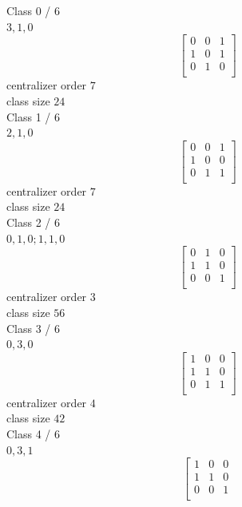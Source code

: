 \begin{mdframed}[style=MyFrame]
$$$$
\bigskip
Class 0 / 6\\
$3,1,0$
$$
\left[
\begin{array}{*{3}{r}}
         0 &          0 &          1\\
         1 &          0 &          1\\
         0 &          1 &          0\\
\end{array}
\right]$$
centralizer order $7$\\class size $24$\\
Class 1 / 6\\
$2,1,0$
$$
\left[
\begin{array}{*{3}{r}}
         0 &          0 &          1\\
         1 &          0 &          0\\
         0 &          1 &          1\\
\end{array}
\right]$$
centralizer order $7$\\class size $24$\\
Class 2 / 6\\
$0,1,0;1,1,0$
$$
\left[
\begin{array}{*{3}{r}}
         0 &          1 &          0\\
         1 &          1 &          0\\
         0 &          0 &          1\\
\end{array}
\right]$$
centralizer order $3$\\class size $56$\\
Class 3 / 6\\
$0,3,0$
$$
\left[
\begin{array}{*{3}{r}}
         1 &          0 &          0\\
         1 &          1 &          0\\
         0 &          1 &          1\\
\end{array}
\right]$$
centralizer order $4$\\class size $42$\\
Class 4 / 6\\
$0,3,1$
$$
\left[
\begin{array}{*{3}{r}}
         1 &          0 &          0\\
         1 &          1 &          0\\
         0 &          0 &          1\\

\end{array}$$
\end{mdframed}
